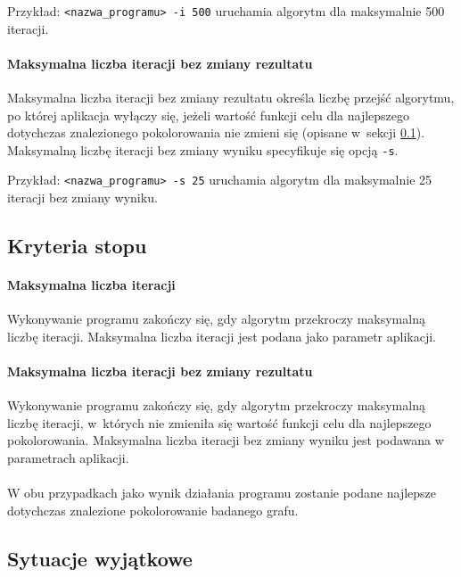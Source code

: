 Przykład: \verb+<nazwa_programu> -i 500+ uruchamia algorytm dla maksymalnie 500 iteracji.

\paragraph{Maksymalna liczba iteracji bez zmiany rezultatu}

Maksymalna liczba iteracji bez zmiany rezultatu określa liczbę przejść algorytmu, po której aplikacja wyłączy się, jeżeli wartość funkcji celu dla najlepszego dotychczas znalezionego pokolorowania nie zmieni się (opisane w~sekcji \ref{sec:stop_criteria}). Maksymalną liczbę iteracji bez zmiany wyniku specyfikuje się opcją \verb+-s+.

Przykład: \verb+<nazwa_programu> -s 25+ uruchamia algorytm dla maksymalnie 25 iteracji bez zmiany wyniku.

\subsection{Kryteria stopu}
\label{sec:stop_criteria}

\paragraph{Maksymalna liczba iteracji}

Wykonywanie programu zakończy się, gdy algorytm przekroczy maksymalną liczbę iteracji. Maksymalna liczba iteracji jest podana jako parametr aplikacji.

\paragraph{Maksymalna liczba iteracji bez zmiany rezultatu}

Wykonywanie programu zakończy się, gdy algorytm przekroczy maksymalną liczbę iteracji, w~których nie zmieniła się wartość funkcji celu dla najlepszego pokolorowania. Maksymalna liczba iteracji bez zmiany wyniku jest podawana w parametrach aplikacji.

\paragraph{}
W obu przypadkach jako wynik działania programu zostanie podane najlepsze dotychczas znalezione pokolorowanie badanego grafu.


\subsection{Sytuacje wyjątkowe}

